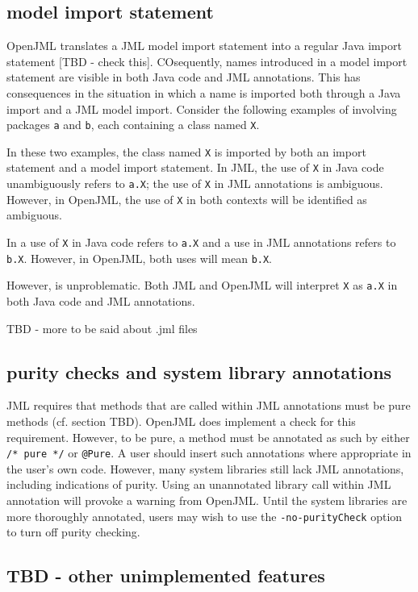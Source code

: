 \subsection{model import statement}
OpenJML translates a JML model import statement into a regular Java import statement [TBD - check this].
COsequently, names introduced in a model import statement are visible in both Java code and JML annotations.
This has consequences in the situation in which a name is imported both through a Java import and a JML model import.
Consider the following examples of involving packages \texttt{a} and \texttt{b}, each containing a class named 
\texttt{X}.

In these two examples,
the class named \texttt{X} is imported by both an import statement and a model import statement. In JML, the use of \texttt{X} in
Java code unambiguously refers to \texttt{a.X}; the use of \texttt{X} in JML annotations is ambiguous. However, in OpenJML,
the use of \texttt{X} in both contexts will be identified as ambiguous.

In
a use of \texttt{X} in Java code refers to \texttt{a.X} and a use in JML annotations refers to \texttt{b.X}.
However, in OpenJML, both uses will mean \texttt{b.X}.

However,
is unproblematic. Both JML and OpenJML will interpret \texttt{X} as \texttt{a.X} in both Java code and JML annotations.

TBD - more to be said about .jml files

\subsection{purity checks and system library annotations}

JML requires that methods that are called within JML annotations must be pure methods (cf. section TBD). OpenJML does implement
a check for this requirement. However, to be pure, a method must be annotated as such by either \texttt{/* pure */} or 
\texttt{@Pure}. A user should insert such annotations where appropriate in the user's own code. However, many system libraries 
still lack JML annotations, including indications of purity. Using an unannotated library call within JML annotation will provoke a warning from OpenJML. Until the system libraries are more thoroughly annotated, users may wish to use the \texttt{-no-purityCheck} option to turn off purity checking.

\subsection{TBD - other unimplemented features}
